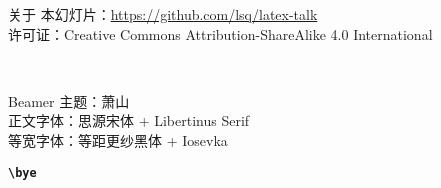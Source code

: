 \begin{frame}{关于}
\vspace*{1.2cm}
\footnotesize
本幻灯片：\url{https://github.com/lsq/latex-talk} \\
许可证：Creative Commons Attribution-ShareAlike 4.0 International
\vspace{0.4cm}
\begin{center}
  \huge
  \faCreativeCommons\,\faCreativeCommonsBy\,\faCreativeCommonsSa
\end{center}
\vspace{2cm}
\begin{flushleft}
  \tiny
  Beamer 主题：萧山  \\
  正文字体：思源宋体 + Libertinus Serif \\
  等宽字体：等距更纱黑体 + Iosevka
\end{flushleft}
\vspace{-0.5cm}
\end{frame}

\begin{frame}[standout]
  \huge \textbf{\texttt{\textbackslash bye}}
\end{frame}
